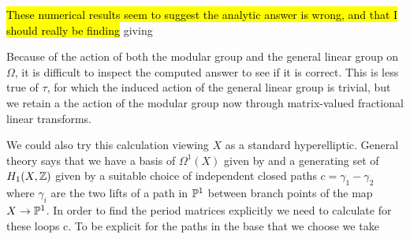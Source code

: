 \documentclass{article}
\begin{document}
\begin{remark}
	\hl{These numerical results seem to suggest the analytic answer is wrong, and that I should really be finding}
	giving 
\end{remark}


\begin{remark}
	Because of the action of both the modular group and the general linear group on $\Omega$, it is difficult to inspect the computed answer to see if it is correct. This is less true of $\tau$, for which the induced action of the general linear group is trivial, but we retain a the action of the modular group now through matrix-valued fractional linear transforms.  
\end{remark}

\begin{remark}
	We could also try this calculation viewing $X$ as a standard hyperelliptic. General theory says that we have a basis of $\Omega^1(X)$ given by 
	and a generating set of $H_1(X,\mathbb{Z})$ given by a suitable choice of independent closed paths $c = \gamma_1 - \gamma_2$ where $\gamma_i$ are the two lifts of a path in $\mathbb{P}^1$ between branch points of the map $X \to \mathbb{P}^1$. In order to find the period matrices explicitly we need to calculate 
	for these loops c. To be explicit for the paths in the base that we choose we take 
\end{remark}
\end{document}
